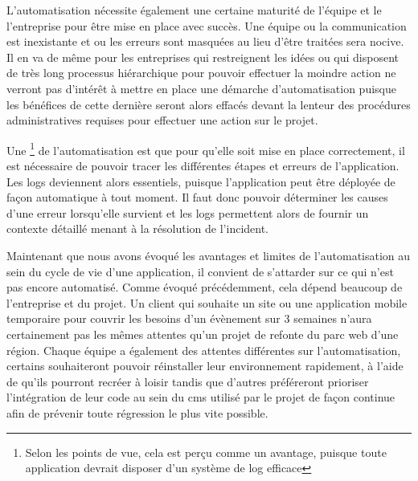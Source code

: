L'automatisation nécessite également une certaine maturité de l'équipe et le l'entreprise pour être mise en place avec succès. Une équipe ou la communication est inexistante et ou les erreurs sont masquées au lieu d'être traitées sera nocive. Il en va de même pour les entreprises qui restreignent les idées ou qui disposent de très long processus hiérarchique pour pouvoir effectuer la moindre action ne verront pas d'intérêt à mettre en place une démarche d'automatisation puisque les bénéfices de cette dernière seront alors effacés devant la lenteur des procédures administratives requises pour effectuer une action sur le projet.

Une \footnote{Selon les points de vue, cela est perçu comme un avantage, puisque toute application devrait disposer d'un système de log efficace} de l'automatisation est que pour qu'elle soit mise en place correctement, il est nécessaire de pouvoir tracer les différentes étapes et erreurs de l'application. Les logs deviennent alors essentiels, puisque l'application peut être déployée de façon automatique à tout moment. Il faut donc pouvoir déterminer les causes d'une erreur lorsqu'elle survient et les logs permettent alors de fournir un contexte détaillé menant à la résolution de l'incident.


Maintenant que nous avons évoqué les avantages et limites de l'automatisation au sein du cycle de vie d'une application, il convient de s'attarder sur ce qui n'est pas encore automatisé. Comme évoqué précédemment, cela dépend beaucoup de l'entreprise et du projet. Un client qui souhaite un site ou une application mobile temporaire pour couvrir les besoins d'un évènement sur 3 semaines n'aura certainement pas les mêmes attentes qu'un projet de refonte du parc web d'une région. Chaque équipe a également des attentes différentes sur l'automatisation, certains souhaiteront pouvoir réinstaller leur environnement rapidement, à l'aide de  qu'ils pourront recréer à loisir tandis que d'autres préféreront prioriser l'intégration de leur code au sein du \gls{cms} utilisé par le projet de façon continue afin de prévenir toute régression le plus vite possible. 


